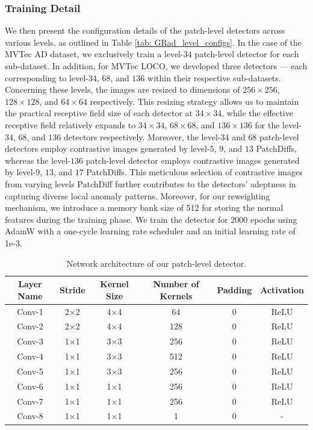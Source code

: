 \subsubsection{Training Detail} We then present the configuration details of the patch-level detectors across various levels, as outlined in Table \ref{tab: GRad_level_configs}. In the case of the MVTec AD dataset, we exclusively train a level-$34$ patch-level detector for each sub-dataset. In addition, for MVTec LOCO, we developed three detectors — each corresponding to level-$34$, $68$, and $136$ within their respective sub-datasets. Concerning these levels, the images are resized to dimensions of $256\times256$, $128\times128$, and $64\times64$ respectively. This resizing strategy allows us to maintain the practical receptive field size of each detector at $34\times34$, while the effective receptive field relatively expands to $34\times34$, $68\times68$, and $136\times136$ for the level-$34$, $68$, and $136$ detectors respectively. Moreover, the level-$34$ and $68$ patch-level detectors employ contrastive images generated by level-$5$, $9$, and $13$ PatchDiffs, whereas the level-$136$ patch-level detector employs contrastive images generated by level-$9$, $13$, and $17$ PatchDiffs. This meticulous selection of contrastive images from varying levels PatchDiff further contributes to the detectors' adeptness in capturing diverse local anomaly patterns. Moreover, for our reweighting mechanism, we introduce a memory bank size of 512 for storing the normal features during the training phase. We train the detector for 2000 epochs using AdamW with a one-cycle learning rate scheduler and an initial learning rate of 1e-3.

\begin{table}[!htpb]
\centering
\footnotesize
\begin{tabular}{cccccc}
\toprule
Layer Name & Stride & Kernel Size & Number of Kernels & Padding & Activation \\
\midrule
Conv-1 & 2$\times$2 & 4$\times$4 & 64 & 0 & ReLU \\
Conv-2 & 2$\times$2 & 4$\times$4 & 128 & 0 & ReLU \\
Conv-3 & 1$\times$1 & 3$\times$3 & 256 & 0 & ReLU \\
Conv-4 & 1$\times$1 & 3$\times$3 & 512 & 0 & ReLU \\
Conv-5 & 1$\times$1 & 3$\times$3 & 256 & 0 & ReLU \\
Conv-6 & 1$\times$1 & 1$\times$1 & 256 & 0 & ReLU \\
Conv-7 & 1$\times$1 & 1$\times$1 & 256 & 0 & ReLU \\
Conv-8 & 1$\times$1 & 1$\times$1 & 1 & 0 & - \\
\bottomrule
\end{tabular}
\caption{Network architecture of our patch-level detector.}
\label{tab: arch_detector}
\end{table}

